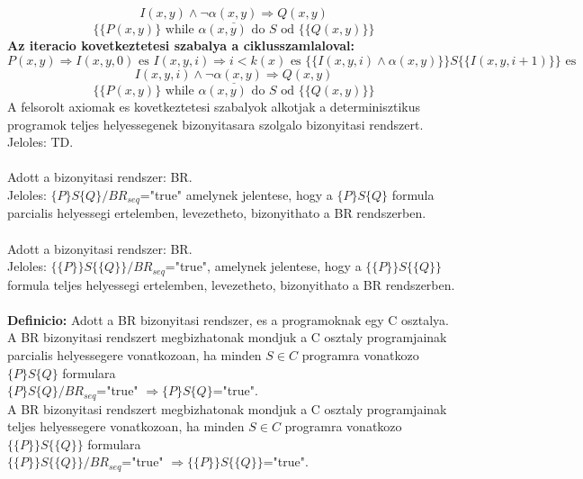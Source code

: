 \documentclass[a4paper,10pt]{article}
\begin{document}
$$\underline{I(x,y)\wedge\neg\alpha(x,y)\Rightarrow Q(x,y)}$$
$$\lbrace\lbrace P(x,y)\rbrace \text{ while } \alpha(x,y) \text{ do } S \text{ od } \lbrace\lbrace Q(x,y)\rbrace\rbrace$$
\textbf{Az iteracio kovetkeztetesi szabalya a ciklusszamlaloval:}
$$P(x,y) \Rightarrow I(x,y,0) \text{ es } I(x,y,i) \Rightarrow i<k(x) \text{ es } \lbrace\lbrace I(x,y,i) \wedge\alpha(x,y)\rbrace\rbrace S \lbrace\lbrace I(x,y,i+1)\rbrace\rbrace \text{ es }$$ $$\underline{I(x,y,i) \wedge\neg\alpha(x,y)\Rightarrow Q(x,y)}$$
$$\lbrace\lbrace P(x,y)\rbrace \text{ while } \alpha(x,y) \text{ do } S \text{ od } \lbrace\lbrace Q(x,y)\rbrace\rbrace$$
A felsorolt axiomak es kovetkeztetesi szabalyok alkotjak a determinisztikus programok teljes helyessegenek bizonyitasara szolgalo bizonyitasi rendszert.\\
Jeloles: TD.\\\\
Adott a bizonyitasi rendszer: BR.\\
Jeloles: $\lbrace P\rbrace S \lbrace Q\rbrace/BR_{seq}$="true" amelynek jelentese, hogy a $\lbrace P\rbrace S\lbrace Q\rbrace$ formula parcialis helyessegi ertelemben, levezetheto, bizonyithato a BR rendszerben.\\\\
Adott a bizonyitasi rendszer: BR.\\
Jeloles: $\lbrace\lbrace P\rbrace\rbrace S \lbrace\lbrace Q\rbrace\rbrace/BR_{seq}$="true", amelynek jelentese, hogy a $\lbrace\lbrace P\rbrace\rbrace S \lbrace\lbrace Q\rbrace\rbrace$ formula teljes helyessegi ertelemben, levezetheto, bizonyithato a BR rendszerben.\\\\
\textbf{Definicio:} Adott a BR bizonyitasi rendszer, es a programoknak egy C osztalya.\\
A BR bizonyitasi rendszert megbizhatonak mondjuk a C osztaly programjainak parcialis helyessegere vonatkozoan, ha minden $S\in C$ programra vonatkozo $\lbrace P\rbrace S\lbrace Q\rbrace$ formulara\\
$\lbrace P\rbrace S\lbrace Q\rbrace/BR_{seq}$="true" $\Rightarrow \lbrace P\rbrace S\lbrace Q\rbrace$="true".\\
A BR bizonyitasi rendszert megbizhatonak mondjuk a C osztaly programjainak teljes helyessegere vonatkozoan, ha minden $S \in C$ programra vonatkozo $\lbrace\lbrace P\rbrace\rbrace S \lbrace\lbrace Q\rbrace\rbrace$ formulara\\
$\lbrace\lbrace P\rbrace\rbrace S \lbrace\lbrace Q\rbrace\rbrace/BR_{seq}$="true" $\Rightarrow \lbrace\lbrace P\rbrace\rbrace S \lbrace\lbrace Q\rbrace\rbrace$="true".\\\\
\end{document}
